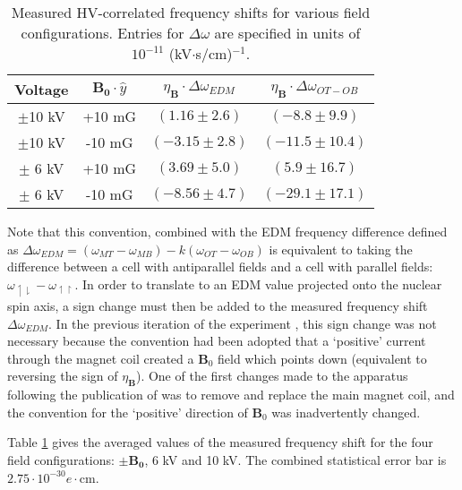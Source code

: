 \documentclass [10pt, twoside] {uwthesis}[2012/04/02]
\begin{document}
\begin{table} \label{final_result_table}															
\begin{center}
\caption[Measured frequency shifts by field configuration]
{\narrower Measured HV-correlated frequency shifts for various field configurations. Entries for $\Delta\omega$ are specified in units of $10^{-11}$ (kV$\cdot$s/cm)$^{-1}$.}
\begin{tabular}{cccc}													%
\hline \hline	 														%
Voltage & $\mathbf{B_0} \cdot \hat{y}$ & $\eta_{\mathbf{B}}\cdot\Delta\omega_{EDM}$ & $\eta_{\mathbf{B}}\cdot\Delta\omega_{OT-OB}$ \\ %
\hline																	%
$\pm$10 kV & +10 mG & $(1.16\pm2.6)$ & $(-8.8\pm9.9)$ \\ %
$\pm$10 kV & -10 mG & $(-3.15\pm2.8)$ & $(-11.5\pm10.4)$ \\ %
$\pm$ 6 kV & +10 mG & $(3.69\pm5.0)$ & $(5.9\pm16.7)$ \\ %
$\pm$ 6 kV & -10 mG & $(-8.56\pm4.7)$ & $(-29.1\pm17.1)$ \\ %
\hline \hline
\end{tabular} 
\end{center}
\end{table}	
	
Note that this convention, combined with the EDM frequency difference defined as $\Delta\omega_{EDM} = (\omega_{MT} - \omega_{MB}) - k(\omega_{OT} - \omega_{OB})$ is equivalent to taking the difference between a cell with antiparallel fields and a cell with parallel fields: $\omega_{\upharpoonleft\downharpoonright} - \omega_{\upharpoonleft\upharpoonright}$. In order to translate to an EDM value projected onto the nuclear spin axis, a sign change must then be added to the measured frequency shift $\Delta\omega_{EDM}$. In the previous iteration of the experiment \cite{2009_Hg_EDM, 2013_Hg_EDM_PRA}, this sign change was not necessary because the convention had been adopted that a `positive' current through the magnet coil created a $\mathbf{B}_0$ field which points down (equivalent to reversing the sign of $\eta_{\mathbf{B}}$). One of the first changes made to the apparatus following the publication of \cite{2009_Hg_EDM} was to remove and replace the main magnet coil, and the convention for the `positive' direction of $\mathbf{B}_0$ was inadvertently changed. 

Table \ref{final_result_table} gives the averaged values of the measured frequency shift for the four field configurations: $\pm \mathbf{B_0}$, 6 kV and 10 kV. The combined statistical error bar is $2.75 \cdot 10^{-30} e \cdot \text{cm}$.
\end{document}
